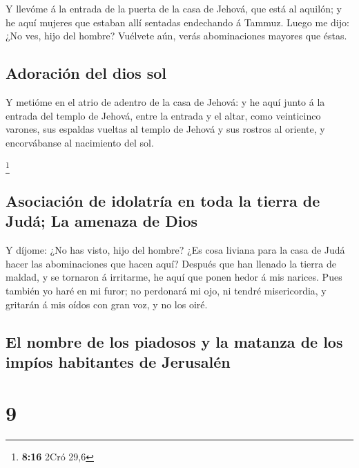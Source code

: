  Y llevóme á la entrada de la puerta de la casa de
Jehová, que está al aquilón; y he aquí mujeres que estaban allí sentadas
endechando á Tammuz.  Luego me dijo: ¿No ves, hijo del
hombre? Vuélvete aún, verás abominaciones mayores que éstas.

\hypertarget{adoraciuxf3n-del-dios-sol}{%
\subsection{Adoración del dios sol}\label{adoraciuxf3n-del-dios-sol}}

 Y metióme en el atrio de adentro de la casa de Jehová: y
he aquí junto á la entrada del templo de Jehová, entre la entrada y el
altar, como veinticinco varones, sus espaldas vueltas al templo de
Jehová y sus rostros al oriente, y encorvábanse al nacimiento del sol.

\footnote{\textbf{8:16} 2Cró 29,6}

\hypertarget{asociaciuxf3n-de-idolatruxeda-en-toda-la-tierra-de-juduxe1-la-amenaza-de-dios}{%
\subsection{Asociación de idolatría en toda la tierra de Judá; La
amenaza de
Dios}\label{asociaciuxf3n-de-idolatruxeda-en-toda-la-tierra-de-juduxe1-la-amenaza-de-dios}}

 Y díjome: ¿No has visto, hijo del hombre? ¿Es cosa
liviana para la casa de Judá hacer las abominaciones que hacen aquí?
Después que han llenado la tierra de maldad, y se tornaron á irritarme,
he aquí que ponen hedor á mis narices.  Pues también yo
haré en mi furor; no perdonará mi ojo, ni tendré misericordia, y
gritarán á mis oídos con gran voz, y no los oiré.

\hypertarget{el-nombre-de-los-piadosos-y-la-matanza-de-los-impuxedos-habitantes-de-jerusaluxe9n}{%
\subsection{El nombre de los piadosos y la matanza de los impíos
habitantes de
Jerusalén}\label{el-nombre-de-los-piadosos-y-la-matanza-de-los-impuxedos-habitantes-de-jerusaluxe9n}}

\hypertarget{section-8}{%
\section{9}\label{section-8}}


